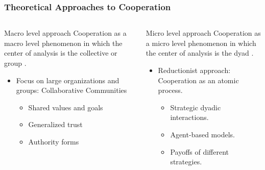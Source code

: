 \documentclass[ignorenonframetext,red,8pt,notes=hide]{beamer}
\begin{document}
\begin{frame}[label=]
\frametitle{Theoretical Approaches to Cooperation}

\begin{columns}[c]
\begin{column}{0.5\textwidth}

\begin{block}{Macro level approach}
Cooperation as a macro level phenomenon in which the center of analysis is the collective or group \citep{marx:1990, adler:2006, adler:2015}.

\begin{itemize}

\item Focus on large organizations and groups: Collaborative Communities

\begin{itemize}

\item Shared values and goals
\item Generalized trust
\item Authority forms

\end{itemize}
\end{itemize}
\end{block}
\end{column}

\pause

\begin{column}{0.5\textwidth}

\begin{block}{Micro level approach}
Cooperation as a micro level phenomenon in which the center of analysis is the dyad \citep{axelrod1981, watts:1999, eguiluz:2005}.

\begin{itemize}

\item Reductionist approach: Cooperation as an atomic process.

\begin{itemize}

\item Strategic dyadic interactions.
\item Agent-based models.
\item Payoffs of different strategies.

\end{itemize}
\end{itemize}

\end{block}


\end{column}
\end{columns}
\end{frame}
\end{document}
